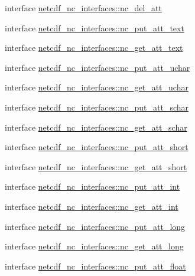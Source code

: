 \begin{DoxyCompactItemize}
interface \hyperlink{interfacenetcdf__nc__interfaces_1_1nc__del__att}{netcdf\+\_\+nc\+\_\+interfaces\+::nc\+\_\+del\+\_\+att}
\item 
interface \hyperlink{interfacenetcdf__nc__interfaces_1_1nc__put__att__text}{netcdf\+\_\+nc\+\_\+interfaces\+::nc\+\_\+put\+\_\+att\+\_\+text}
\item 
interface \hyperlink{interfacenetcdf__nc__interfaces_1_1nc__get__att__text}{netcdf\+\_\+nc\+\_\+interfaces\+::nc\+\_\+get\+\_\+att\+\_\+text}
\item 
interface \hyperlink{interfacenetcdf__nc__interfaces_1_1nc__put__att__uchar}{netcdf\+\_\+nc\+\_\+interfaces\+::nc\+\_\+put\+\_\+att\+\_\+uchar}
\item 
interface \hyperlink{interfacenetcdf__nc__interfaces_1_1nc__get__att__uchar}{netcdf\+\_\+nc\+\_\+interfaces\+::nc\+\_\+get\+\_\+att\+\_\+uchar}
\item 
interface \hyperlink{interfacenetcdf__nc__interfaces_1_1nc__put__att__schar}{netcdf\+\_\+nc\+\_\+interfaces\+::nc\+\_\+put\+\_\+att\+\_\+schar}
\item 
interface \hyperlink{interfacenetcdf__nc__interfaces_1_1nc__get__att__schar}{netcdf\+\_\+nc\+\_\+interfaces\+::nc\+\_\+get\+\_\+att\+\_\+schar}
\item 
interface \hyperlink{interfacenetcdf__nc__interfaces_1_1nc__put__att__short}{netcdf\+\_\+nc\+\_\+interfaces\+::nc\+\_\+put\+\_\+att\+\_\+short}
\item 
interface \hyperlink{interfacenetcdf__nc__interfaces_1_1nc__get__att__short}{netcdf\+\_\+nc\+\_\+interfaces\+::nc\+\_\+get\+\_\+att\+\_\+short}
\item 
interface \hyperlink{interfacenetcdf__nc__interfaces_1_1nc__put__att__int}{netcdf\+\_\+nc\+\_\+interfaces\+::nc\+\_\+put\+\_\+att\+\_\+int}
\item 
interface \hyperlink{interfacenetcdf__nc__interfaces_1_1nc__get__att__int}{netcdf\+\_\+nc\+\_\+interfaces\+::nc\+\_\+get\+\_\+att\+\_\+int}
\item 
interface \hyperlink{interfacenetcdf__nc__interfaces_1_1nc__put__att__long}{netcdf\+\_\+nc\+\_\+interfaces\+::nc\+\_\+put\+\_\+att\+\_\+long}
\item 
interface \hyperlink{interfacenetcdf__nc__interfaces_1_1nc__get__att__long}{netcdf\+\_\+nc\+\_\+interfaces\+::nc\+\_\+get\+\_\+att\+\_\+long}
\item 
interface \hyperlink{interfacenetcdf__nc__interfaces_1_1nc__put__att__float}{netcdf\+\_\+nc\+\_\+interfaces\+::nc\+\_\+put\+\_\+att\+\_\+float}
\item 

\end{DoxyCompactItemize}
